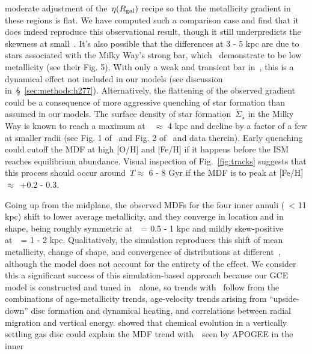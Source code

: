 \documentclass[draft2.tex]{subfiles}
\begin{document}
moderate adjustment of the~$\eta(R_\text{gal})$ recipe so that the metallicity 
gradient in these regions is flat. 
We have computed such a comparison case and find that it does indeed reproduce 
this observational result, though it still underpredicts the skewness at 
small~\rgal. 
{\color{red} 
It's also possible that the differences at 3 - 5 kpc are due to stars 
associated with the Milky Way's strong bar, which~\citet{Bovy2019} demonstrate 
to be low metallicity (see their Fig. 5). 
With only a weak and transient bar in~\hsim, this is a dynamical effect not 
included in our models (see discussion in~\S~\ref{sec:methods:h277}). 
}
Alternatively, the flattening of the observed gradient could be a consequence 
of more aggressive quenching of star formation than assumed in our models. 
The surface density of star formation~$\dot{\Sigma}_\star$ in the Milky Way 
is known to reach a maximum at~\rgal~$\approx$ 4 kpc and decline by a factor 
of a few at smaller radii (see Fig. 1 of~\citealp{Peek2009} and Fig. 2 
of~\citealp{Fraternali2012} and data therein). 
Early quenching could cutoff the MDF at high [O/H] and [Fe/H] if it happens 
before the ISM reaches equilibrium abundance. 
Visual inspection of Fig.~\ref{fig:tracks} suggests that this process should 
occur around~$T \approx$ 6 - 8 Gyr if the MDF is to peak at 
[Fe/H]~$\approx$~+0.2 - 0.3. 
\par 
Going up from the midplane, the observed MDFs for the four inner annuli 
(\rgal~< 11 kpc) shift to lower average metallicity, and they converge in 
location and in shape, being roughly symmetric at~\absz~= 0.5 - 1 kpc and 
mildly skew-positive at~\absz~= 1 - 2 kpc. 
Qualitatively, the simulation reproduces this shift of mean metallicity, change 
of shape, and convergence of distributions at different~\rgal, although the 
model does not account for the entirety of the effect. 
We consider this a significant success of this simulation-based approach 
because our GCE model is constructed and tuned in~\rgal~alone, so trends with 
\absz~follow from the combinations of age-metallicity trends, age-velocity 
trends arising from ``upside-down'' disc formation and dynamical heating, and 
correlations between radial migration and vertical energy. 
\citet{Freudenburg2017} showed that chemical evolution in a vertically settling 
gas disc could explain the MDF trend with~\absz~seen by APOGEE in the inner 
\end{document}
